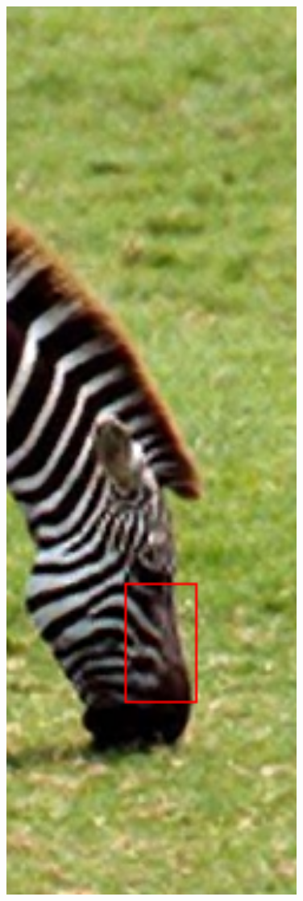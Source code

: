 \documentclass[review,numbers,sort&compress]{elsarticle}  %
\begin{document}
\begin{figure}[t]
{\begin{minipage}[b]{0.12\textwidth}
                \includegraphics[width=1\textwidth]{compareImage/zebra_crop_PLHT.png} \\

\end{minipage}}
\end{figure}
\end{document}
